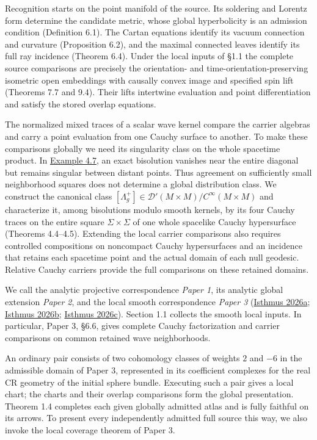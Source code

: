 \documentclass[
  english,
  11pt,
  reqno]{amsart}
\begin{document}
Recognition starts on the point manifold of the source. Its soldering
and Lorentz form determine the candidate metric, whose global
hyperbolicity is an admission condition (Definition 6.1). The Cartan
equations identify its vacuum connection and curvature (Proposition
6.2), and the maximal connected leaves identify its full ray incidence
(Theorem 6.4). Under the local inputs of §1.1 the complete source
comparisons are precisely the orientation- and
time-orientation-preserving isometric open embeddings with causally
convex image and specified spin lift (Theorems 7.7 and 9.4). Their lifts
intertwine evaluation and point differentiation and satisfy the stored
overlap equations.

The normalized mixed traces of a scalar wave kernel compare the carrier
algebras and carry a point evaluation from one Cauchy surface to
another. To make these comparisons globally we need its singularity
class on the whole spacetime product. In
\hyperref[ex:torus-remote-bisolution]{Example 4.7}, an exact bisolution
vanishes near the entire diagonal but remains singular between distant
points. Thus agreement on sufficiently small neighborhood squares does
not determine a global distribution class. We construct the canonical
class \([\Lambda_g^+]\in\mathcal D'(M\times M)/C^\infty(M\times M)\) and
characterize it, among bisolutions modulo smooth kernels, by its four
Cauchy traces on the entire square \(\Sigma\times\Sigma\) of one whole
spacelike Cauchy hypersurface (Theorems 4.4--4.5). Extending the local
carrier comparisons also requires controlled compositions on noncompact
Cauchy hypersurfaces and an incidence that retains each spacetime point
and the actual domain of each null geodesic. Relative Cauchy carriers
provide the full comparisons on these retained domains.

We call the analytic projective correspondence \emph{Paper 1}, its
analytic global extension \emph{Paper 2}, and the local smooth
correspondence \emph{Paper 3}
(\hyperref[ref-IsthmusProjective2026]{Isthmus 2026a};
\hyperref[ref-IsthmusGlobal2026]{Isthmus 2026b};
\hyperref[ref-IsthmusSmooth2026]{Isthmus 2026c}). Section 1.1 collects
the smooth local inputs. In particular, Paper 3, §6.6, gives complete
Cauchy factorization and carrier comparisons on common retained wave
neighborhoods.

An ordinary pair consists of two cohomology classes of weights \(2\) and
\(-6\) in the admissible domain of Paper 3, represented in its
coefficient complexes for the real CR geometry of the initial sphere
bundle. Executing such a pair gives a local chart; the charts and their
overlap comparisons form the global presentation. Theorem 1.4 completes
each given globally admitted atlas and is fully faithful on its arrows.
To present every independently admitted full source this way, we also
invoke the local coverage theorem of Paper 3.
\end{document}
